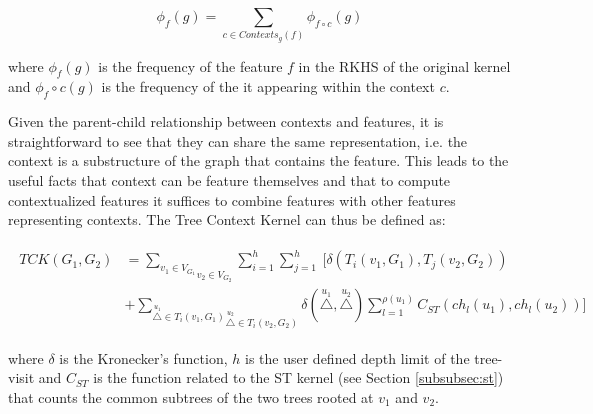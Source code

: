 \begin{equation}
    \phi_f(g) = \sum_{c \in Contexts_g(f)} \phi_{f\circ c}(g)
\end{equation}

where $\phi_f(g)$ is the frequency of the feature $f$ in the RKHS of the original
kernel and $\phi_f\circ c(g)$ is the frequency of the it appearing within the
context $c$.

Given the parent-child relationship between contexts and features, it is
straightforward to see that they can share the same representation, i.e. the
context is a substructure of the graph that contains the feature.
This leads to the useful facts that context can be feature themselves and that to
compute contextualized features it suffices to combine features with other
features representing contexts.
The Tree Context Kernel can thus be defined as:

\begin{gather}
    \begin{aligned}
        TCK(G_1,G_2) &= \underset{v_2 \in V_{G_2}}{\underset{v_1 \in V_{G_1}}{\sum}}
        \sum_{i=1}^h\sum_{j=1}^h
        ~[\delta(T_i(v_1,G_1),T_j(v_2,G_2))\\
            &+\underset{\overset{u_2}{\triangle} \in T_i(v_2,G_2)}{\underset{\overset{u_1}{\triangle} \in T_i(v_1,G_1)}{\sum}}
        \delta(\overset{u_1}{\triangle},\overset{u_2}{\triangle})
    \sum_{l=1}^{\rho(u_1)} C_{ST}(ch_l(u_1),ch_l(u_2))]
    \end{aligned}
\end{gather}

%

where $\delta$ is the Kronecker's function, $h$ is the user defined depth limit of 
the tree-visit and $C_{ST}$ is the function related to the ST kernel (see Section \ref{subsubsec:st}) that counts the common
subtrees of the two trees rooted at $v_1$ and $v_2$.

